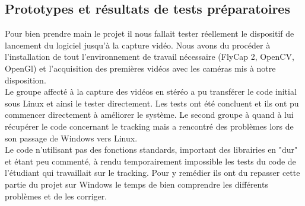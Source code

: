 \subsection{Prototypes et résultats de tests préparatoires}

Pour bien prendre main le projet il nous fallait tester réellement le dispositif de lancement du logiciel jusqu'à la capture vidéo. Nous avons du  procéder à l'installation de tout l'environnement de travail nécessaire (FlyCap 2, OpenCV, OpenGl) et l’acquisition des premières vidéos avec les caméras mis à notre disposition. \\

 Le groupe affecté à la capture des vidéos en stéréo a pu transférer le code initial sous Linux et ainsi le tester directement. Les tests ont été concluent et ils ont pu commencer directement à améliorer le système. Le second groupe à quand à lui récupérer le code concernant le tracking mais a rencontré des problèmes lors de son passage de Windows vers Linux. \\
 Le code n'utilisant pas des fonctions standards, important des librairies en "dur" et étant peu commenté, à rendu temporairement impossible les tests du code de l'étudiant qui travaillait sur le tracking. Pour y remédier ils ont du repasser cette partie du projet sur Windows le temps de bien comprendre les différents problèmes et de les corriger.